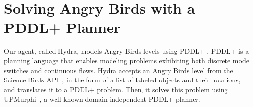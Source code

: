 \documentclass[letterpaper]{article} %
\begin{document}
\section{Solving Angry Birds with a PDDL+ Planner}



Our agent, called Hydra, models Angry Birds levels using PDDL+ \cite{fox2006modelling}. PDDL+ is a planning language that enables modeling problems exhibiting both discrete mode switches and continuous flows.
Hydra accepts an Angry Birds level from the Science Birds API~\cite{renz2019ai}, in the form of a list of labeled objects and their locations, and translates it to a PDDL+ problem.
Then, it solves this problem using  UPMurphi~\cite{della2009upmurphi}, a well-known domain-independent PDDL+ planner. %

\end{document}
